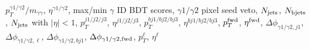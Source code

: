 $p_T^{\gamma 1/\gamma 2}/m_{\gamma\gamma}$, $\eta^{\gamma 1/\gamma 2}$, max/min $\gamma$ ID BDT scores, $\gamma 1/\gamma 2$ pixel seed veto, $N_{\rm{jets}}$, $N_{\rm{bjets}}$, $N_{\rm{jets}}$ with $|\eta|<1$, $p_T^{j1/j2/j3}$, $\eta^{j1/j2/j3}$, $p_T^{bj1/bj2/bj3}$, $\eta^{bj1/bj2/bj3}$, $p_T^{\rm{fwd}}$, $\eta^{\rm{fwd}}$, $\Delta\phi_{\gamma 1/\gamma 2,j1}$, $\Delta\phi_{\gamma 1/\gamma 2,\ell}$, $\Delta\phi_{\gamma 1/\gamma 2,bj1}$, $\Delta\phi_{\gamma 1/\gamma 2,{\rm{fwd}}}$, $p_T^\ell$, $\eta^\ell$